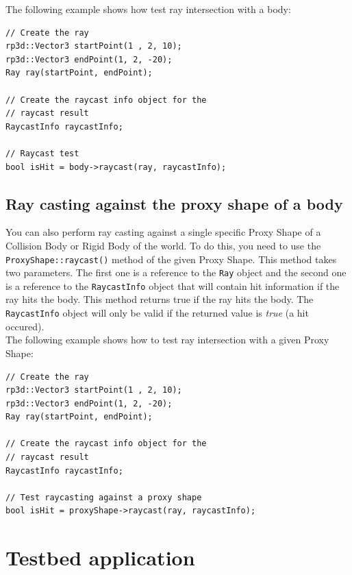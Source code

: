 \documentclass[a4paper,12pt]{article}
\begin{document}
    The following example shows how test ray intersection with a body: \\

    \begin{lstlisting}
// Create the ray
rp3d::Vector3 startPoint(1 , 2, 10);
rp3d::Vector3 endPoint(1, 2, -20);
Ray ray(startPoint, endPoint);

// Create the raycast info object for the
// raycast result
RaycastInfo raycastInfo;

// Raycast test
bool isHit = body->raycast(ray, raycastInfo);
    \end{lstlisting}

    \vspace{0.6cm}

    \subsection{Ray casting against the proxy shape of a body}

    You can also perform ray casting against a single specific Proxy Shape of a Collision Body or Rigid Body of the world. To do this, you need to use the
    \texttt{ProxyShape::raycast()} method of the given Proxy Shape. This method takes two parameters. The first one is a reference to the \texttt{Ray}
    object and the second one is a reference to the \texttt{RaycastInfo} object that will contain hit information if the ray hits the body. This method returns
    true if the ray hits the body. The \texttt{RaycastInfo} object will only be valid if the returned value is \emph{true} (a hit occured). \\

    The following example shows how to test ray intersection with a given Proxy Shape: \\

    \begin{lstlisting}
// Create the ray
rp3d::Vector3 startPoint(1 , 2, 10);
rp3d::Vector3 endPoint(1, 2, -20);
Ray ray(startPoint, endPoint);

// Create the raycast info object for the
// raycast result
RaycastInfo raycastInfo;

// Test raycasting against a proxy shape
bool isHit = proxyShape->raycast(ray, raycastInfo);
    \end{lstlisting}

    \vspace{0.6cm}

    \section{Testbed application}
    \label{sec:testbed}
\end{document}
